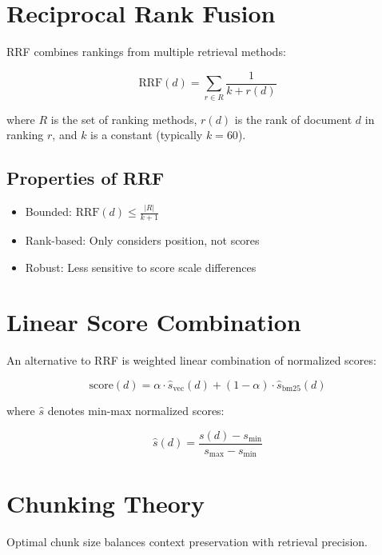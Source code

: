 \documentclass{article}
\begin{document}
\section{Reciprocal Rank Fusion}

RRF combines rankings from multiple retrieval methods:

\begin{equation}
\text{RRF}(d) = \sum_{r \in R} \frac{1}{k + r(d)}
\end{equation}

where $R$ is the set of ranking methods, $r(d)$ is the rank of document $d$ in ranking $r$, and $k$ is a constant (typically $k = 60$).

\subsection{Properties of RRF}

\begin{itemize}
    \item Bounded: $\text{RRF}(d) \leq \frac{|R|}{k+1}$
    \item Rank-based: Only considers position, not scores
    \item Robust: Less sensitive to score scale differences
\end{itemize}

\section{Linear Score Combination}

An alternative to RRF is weighted linear combination of normalized scores:

\begin{equation}
\text{score}(d) = \alpha \cdot \hat{s}_{\text{vec}}(d) + (1-\alpha) \cdot \hat{s}_{\text{bm25}}(d)
\end{equation}

where $\hat{s}$ denotes min-max normalized scores:

\begin{equation}
\hat{s}(d) = \frac{s(d) - s_{\min}}{s_{\max} - s_{\min}}
\end{equation}

\section{Chunking Theory}

Optimal chunk size balances context preservation with retrieval precision.
\end{document}

